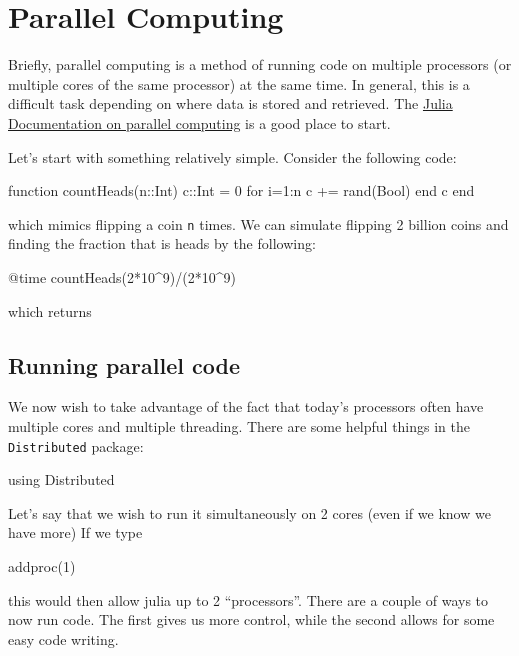 
\chapter{Parallel Computing} \label{ch:parallel}

Briefly, parallel computing is a method of running code on multiple
processors (or multiple cores of the same processor) at the same time.
In general, this is a difficult task depending on where data is stored
and retrieved. The
\href{https://docs.julialang.org/en/v1/manual/parallel-computing/}{Julia
Documentation on parallel computing} is a good place to start.

Let's start with something relatively simple. Consider the following
code:

\begin{jlcode}[parallel]
 function countHeads(n::Int)
    c::Int = 0
    for i=1:n
        c += rand(Bool)
    end
    c
end
\end{jlcode}

which mimics flipping a coin \texttt{n} times. We can simulate flipping
2 billion coins and finding the fraction that is heads by the
following:

\begin{jlverbatim}
@time countHeads(2*10^9)/(2*10^9)
\end{jlverbatim}
%
which returns \printpythontex[verbatim]


\section{Running parallel code}

We now wish to take advantage of the fact that today's processors often
have multiple cores and multiple threading. There are some helpful
things in the \texttt{Distributed} package:

\begin{jlblock}[parallel]
using Distributed
\end{jlblock}

Let's say that we wish to run it simultaneously on 2 cores (even if we
know we have more) If we type

\begin{jlverbatim}
addproc(1)
\end{jlverbatim}

this would then allow julia up to 2 ``processors''. There are a couple of ways to now run code. The first gives us more control, while the second allows for some easy code writing.


